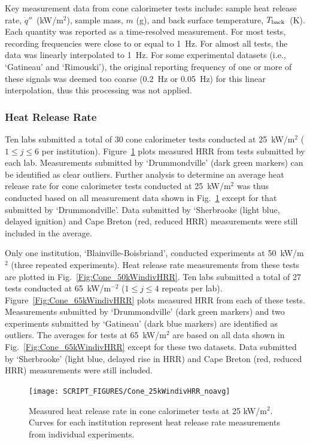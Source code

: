 \documentclass{book}
\begin{document}
Key measurement data from cone calorimeter tests include: sample heat release rate, $\dot{q}''$~(kW/m$^2$), sample mass, $m$ (g), and back surface temperature, $T_{\rm back}$~(K). Each quantity was reported as a time-resolved measurement. For most tests, recording frequencies were close to or equal to 1~Hz. For almost all tests, the data was linearly interpolated to 1~Hz. For some experimental datasets (i.e., `Gatineau' and `Rimouski'), the original reporting frequency of one or more of these signals was deemed too coarse (0.2~Hz or 0.05~Hz) for this linear interpolation, thus this processing was not applied.

\subsubsection{Heat Release Rate}

Ten labs submitted a total of 30 cone calorimeter tests conducted at 25~kW/m$^2$ ($1\le j\le6$ per institution). Figure~\ref{Fig:Cone_25kWindivHRR} plots measured HRR from tests submitted by each lab. Measurements submitted by ‘Drummondville’ (dark green markers) can be identified as clear outliers. Further analysis to determine an average heat release rate for cone calorimeter tests conducted at 25~kW/m$^2$ was thus conducted based on all measurement data shown in Fig.~\ref{Fig:Cone_25kWindivHRR} except for that submitted by ‘Drummondville’. Data submitted by ‘Sherbrooke (light blue, delayed ignition) and Cape Breton (red, reduced HRR) measurements were still included in the average.

Only one institution, ‘Blainville-Boisbriand’, conducted experiments at 50~kW/m$^2$ (three repeated experiments). Heat release rate measurements from these tests are plotted in Fig.~\ref{Fig:Cone_50kWindivHRR}.
Ten labs submitted a total of 27 tests conducted at 65~kW/m$^{-2}$ ($1\le j\le4$ repeats per lab). Figure~\ref{Fig:Cone_65kWindivHRR} plots measured HRR from each of these tests. Measurements submitted by ‘Drummondville’ (dark green markers) and two experiments submitted by ‘Gatineau’ (dark blue markers) are identified as outliers. The averages for tests at 65~kW/m$^2$ are based on all data shown in Fig.~\ref{Fig:Cone_65kWindivHRR} except for these two datasets. Data submitted by ‘Sherbrooke' (light blue, delayed rise in HRR) and Cape Breton (red, reduced HRR) measurements were still included.

\begin{figure}
  \centering
  \texttt{[image: SCRIPT\_FIGURES/Cone\_25kWindivHRR\_noavg]}
  \caption{Measured heat release rate in cone calorimeter tests at 25 kW/m$^2$. Curves for each institution represent heat release rate measurements from individual experiments.}
  \label{Fig:Cone_25kWindivHRR}
\end{figure}
\end{document}
